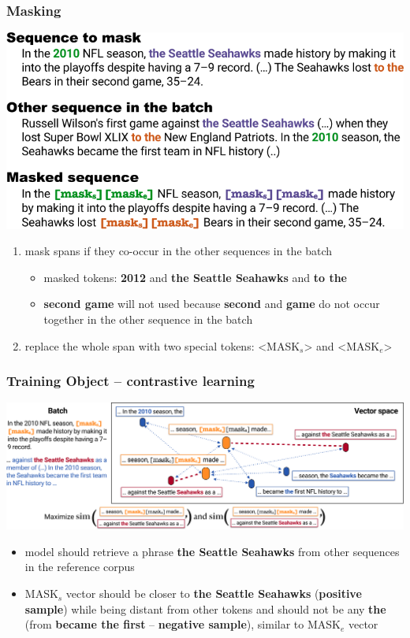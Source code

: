 \documentclass{beamer}
\begin{document}
\begin{frame}
    \frametitle{Masking}
    \begin{center}
        \includegraphics[scale=1.15]{img/npm4.png}
    \end{center}
    \begin{enumerate}
        \footnotesize
        \item mask spans if they co-occur in the other sequences in the batch
        \begin{itemize}
            \item masked tokens: \textbf{2012} and \textbf{the Seattle Seahawks} and \textbf{to the}
            \item \textbf{second game} will not used because \textbf{second} and \textbf{game} do not occur together in the other sequence in the batch
        \end{itemize}
        \item replace the whole span with two special tokens: <MASK$_s$> and <MASK$_e$>
    \end{enumerate}
\end{frame}

\begin{frame}
    \frametitle{Training Object -- contrastive learning}
    \begin{center}
        \includegraphics[scale=0.79]{img/npm3.png}
    \end{center}
    \begin{itemize}
        \footnotesize
        \item model should retrieve a phrase \textbf{the Seattle Seahawks} from other sequences in the reference corpus
        \item MASK$_{s}$ vector should be closer to \textbf{the Seattle Seahawks} (\textbf{positive sample}) while being distant from other tokens and should not be any \textbf{the} (from \textbf{became the first} -- \textbf{negative sample}), similar to MASK$_{e}$ vector
    \end{itemize}
\end{frame}
\end{document}
